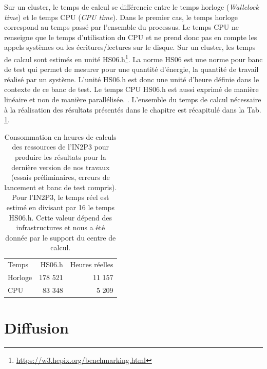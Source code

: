 Sur un cluster, le temps de calcul se différencie entre le temps horloge (\textit{Wallclock time}) et le temps CPU (\textit{CPU time}). Dans le premier cas, le temps horloge correspond au temps passé par l'ensemble du processus. Le temps CPU ne renseigne que le temps d'utilisation du CPU et ne prend donc pas en compte les appels systèmes ou les écritures/lectures sur le disque. Sur un cluster, les temps de calcul sont estimés en unité HS06.h\footnote{\url{https://w3.hepix.org/benchmarking.html}}. La norme HS06 est une norme pour banc de test qui permet de mesurer pour une quantité d'énergie, la quantité de travail réalisé par un système. L'unité HS06.h est donc une unité d'heure définie dans le contexte de ce banc de test. Le temps CPU HS06.h est aussi exprimé de manière linéaire et non de manière parallélisée. . L'ensemble du temps de calcul nécessaire à la réalisation des résultats présentés dans le chapitre \chapAnalysisN{} est récapitulé dans la Tab. \ref{tab:consumption_in2p3}.
\begin{table}
    \centering
    \begin{tabular}{lrr}
        \hline
        Temps         & HS06.h   & Heures réelles \\
        Horloge       &  178 521 &    11 157  \\
        CPU           &  83 348  &     5 209  \\
    \end{tabular}
    \caption{Consommation en heures de calculs des ressources de l'IN2P3 pour produire les résultats pour la dernière version de nos travaux (essais préliminaires, erreurs de lancement et banc de test compris). Pour l'IN2P3, le temps réel est estimé en divisant par 16 le temps HS06.h. Cette valeur dépend des infrastructures et nous a été donnée par le support du centre de calcul.}
    \label{tab:consumption_in2p3}
\end{table}
\section{Diffusion}
